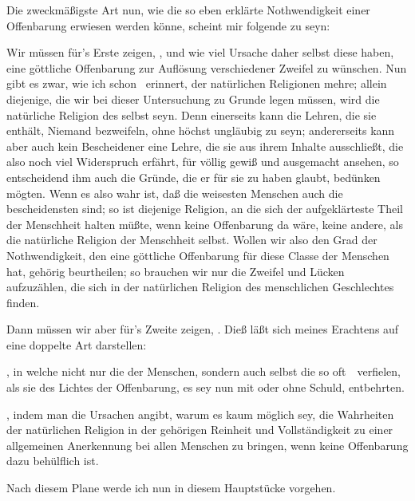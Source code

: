 Die zweckmäßigste Art nun, wie die so eben erklärte Nothwendigkeit einer Offenbarung erwiesen werden könne, scheint mir folgende zu seyn:
\begin{aufza}
\item Wir müssen für's Erste zeigen, , und wie viel Ursache daher selbst diese haben, eine göttliche Offenbarung zur Auflösung verschiedener Zweifel zu wünschen. Nun gibt es zwar, wie ich schon \ erinnert, der natürlichen Religionen mehre; allein diejenige, die wir bei dieser Untersuchung zu Grunde legen müssen, wird die natürliche Religion des  selbst seyn. Denn einerseits kann die Lehren, die sie enthält, Niemand bezweifeln, ohne höchst ungläubig zu seyn; andererseits kann aber auch kein Bescheidener eine Lehre, die sie aus ihrem Inhalte ausschließt, die also noch viel Widerspruch erfährt, für völlig gewiß und ausgemacht ansehen, so entscheidend ihm auch die Gründe, die er für sie zu haben glaubt, bedünken mögten. Wenn es also wahr ist, daß die weisesten Menschen auch die bescheidensten sind; so ist diejenige Religion, an die sich der aufgeklärteste Theil der Menschheit halten müßte, wenn keine Offenbarung da wäre, keine andere, als die natürliche Religion der Menschheit selbst. Wollen wir also den Grad der Nothwendigkeit, den eine göttliche Offenbarung für diese Classe der Menschen hat, gehörig beurtheilen; so brauchen wir nur die Zweifel und Lücken aufzuzählen, die sich in der natürlichen Religion des menschlichen Geschlechtes finden.
\item Dann müssen wir aber für's Zweite zeigen, . Dieß läßt sich meines Erachtens auf eine doppelte Art darstellen:
\begin{aufzb}
\item {}, in welche nicht nur die  der Menschen, sondern auch selbst die  so oft~\ verfielen, als sie des Lichtes der Offenbarung, es sey nun mit oder ohne Schuld, entbehrten.
\item {}, indem man die Ursachen angibt, warum es kaum möglich sey, die Wahrheiten der natürlichen Religion in der gehörigen Reinheit und Vollständigkeit zu einer allgemeinen Anerkennung bei allen Menschen zu bringen, wenn keine Offenbarung dazu behülflich ist.\par
Nach diesem Plane werde ich nun in diesem Hauptstücke vorgehen.
\end{aufzb}
\end{aufza}
   
